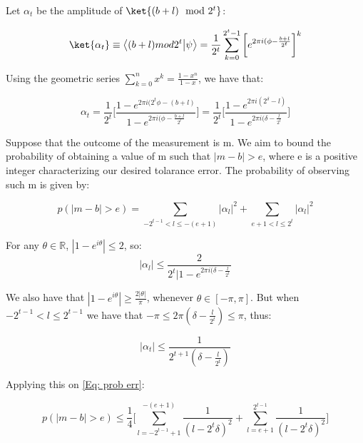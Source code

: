 Let $\alpha_t$ be the amplitude of $\ket{(b+l) \mod 2^t}$:

\begin{equation}
\ket{\alpha_t} \equiv \ip{(b+l) mod 2^t}{\psi} = \frac{1}{2^t} \sum_{k=0}^{2^t - 1} \bigg[ e^{2\pi i (\phi - \frac{b+l}{2^t}} \bigg]^k 
\end{equation}

Using the geometric series $\sum_{k=0}^n x^k = \frac{1 - x^n}{1 - x}$, we have that:

\begin{equation}
    \alpha_t = \frac{1}{2^t} \bigg[ \frac{1 - e^{2 \pi i ( 2^t \phi - (b+l)}}{1 - e^{2 \pi i ( \phi - \frac{b+l}{2^t}}} \bigg] = \frac{1}{2^t} \bigg[ \frac{1 - e^{2 \pi i ( 2^\delta - l)}}{1 - e^{2 \pi i ( \delta - \frac{l}{2^t}}} \bigg]
\end{equation}

Suppose that the outcome of the measurement is m. We aim to bound the probability of obtaining a value of m such that $| m - b| > e$, where e is a positive integer characterizing our desired tolarance error. The probability of observing such m is given by:

\begin{equation}
    \label{Eq: prob err}
    p(|m-b| > e) = \sum_{-2^{t-1} < l \leq -(e+1)} |\alpha_l|^2 + \sum_{e+1 < l \leq 2^t} |\alpha_l|^2
\end{equation}

For any $\theta \in \mathbb{R}$, $|1 - e^{i\theta}| \leq 2$, so:
\begin{equation}
    |\alpha_l| \leq \frac{2}{2^t | 1 - e^{2 \pi i ( \delta - \frac{l}{2^t}}}
\end{equation}

We also have that $|1 - e^{i\theta}| \geq \frac{2 |\theta|}{\pi}$, whenever $\theta \in [-\pi,\pi]$. But when $-2^{t-1} < l \leq 2^{t-1}$ we have that $-\pi \leq 2\pi (\delta - \frac{l}{2^t}) \leq \pi$, thus:

\begin{equation}
    |\alpha_t| \leq \frac{1}{2^{t+1}(\delta - \frac{l}{2^t})}
\end{equation}

Applying this on \ref{Eq: prob err}:

\begin{equation}
    p(|m - b| > e) \leq \frac{1}{4} \bigg[ \sum_{l=-2^{t-1} + 1}^{-(e+1)} \frac{1}{(l - 2^t \delta)^2} + \sum_{l=e+1}^{2^{t-1}} \frac{1}{(l - 2^t \delta)^2} \bigg]
\end{equation}

